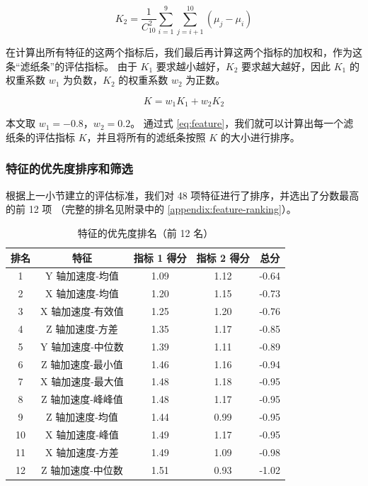 \documentclass[withoutpreface]{cumcmthesis}
\begin{document}
\begin{equation}
    \label{eq:feature-2}
    K_2 = \frac{1}{C_{10}^2} \sum_{i=1}^{9}\sum_{j=i+1}^{10} \left( \mu_{j} - \mu_{i} \right)
\end{equation}

在计算出所有特征的这两个指标后，我们最后再计算这两个指标的加权和，作为这条“滤纸条”的评估指标。
由于 $K_1$ 要求越小越好，$K_2$ 要求越大越好，因此 $K_1$ 的权重系数 $w_1$ 为负数，$K_2$ 的权重系数 $w_2$ 为正数。

\begin{equation}
    \label{eq:feature}
    K = w_1 K_1 + w_2 K_2
\end{equation}

本文取 $w_1 = - 0.8$，$w_2 = 0.2$。 
通过式 \cref{eq:feature}，我们就可以计算出每一个滤纸条的评估指标 $K$，并且将所有的滤纸条按照 $K$ 的大小进行排序。

\subsubsection{特征的优先度排序和筛选}

根据上一小节建立的评估标准，我们对 48 项特征进行了排序，并选出了分数最高的前 12 项
（完整的排名见附录中的 \cref{appendix:feature-ranking}）。

\begin{table}[!htbp]
    \centering
    \caption{特征的优先度排名（前 12 名）}
    \begin{tabular}{|c|c|c|c|c|}
        \hline
        排名 & 特征 & 指标 1 得分 & 指标 2 得分 & 总分 \\ \hline
        1 & Y 轴加速度-均值 & 1.09 & 1.12 & -0.64 \\ \hline
        2 & X 轴加速度-均值 & 1.20 & 1.15 & -0.73 \\ \hline
        3 & X 轴加速度-有效值 & 1.25 & 1.20 & -0.76 \\ \hline
        4 & Z 轴加速度-方差 & 1.35 & 1.17 & -0.85 \\ \hline
        5 & Y 轴加速度-中位数 & 1.39 & 1.11 & -0.89 \\ \hline
        6 & Z 轴加速度-最小值 & 1.46 & 1.16 & -0.94 \\ \hline
        7 & X 轴加速度-最大值 & 1.48 & 1.18 & -0.95 \\ \hline
        8 & Z 轴加速度-峰峰值 & 1.48 & 1.17 & -0.95 \\ \hline
        9 & Z 轴加速度-均值 & 1.44 & 0.99 & -0.95 \\ \hline
        10 & X 轴加速度-峰值 & 1.49 & 1.17 & -0.95 \\ \hline
        11 & X 轴加速度-方差 & 1.49 & 1.09 & -0.98 \\ \hline
        12 & Z 轴加速度-中位数 & 1.51 & 0.93 & -1.02 \\ \hline
    \end{tabular}
\end{table}
\end{document}
